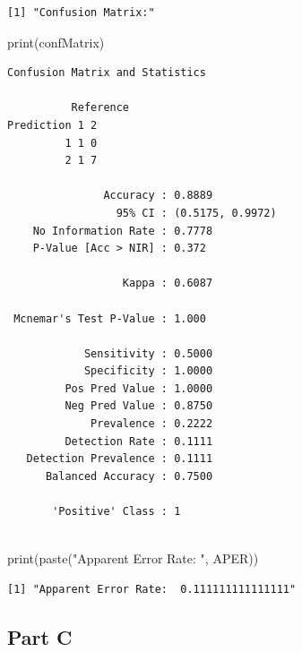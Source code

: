 \documentclass[
  letterpaper,
  DIV=11,
  numbers=noendperiod]{scrartcl}
\newenvironment{Shaded}{}{}
\newcommand{\FunctionTok}[1]{\textcolor[rgb]{0.41,0.62,0.42}{#1}}
\newcommand{\NormalTok}[1]{\textcolor[rgb]{0.24,0.22,0.21}{#1}}
\newcommand{\StringTok}[1]{\textcolor[rgb]{0.60,0.59,0.10}{#1}}
\begin{document}
\begin{verbatim}
[1] "Confusion Matrix:"
\end{verbatim}

\begin{Shaded}
\begin{Highlighting}[]
\FunctionTok{print}\NormalTok{(confMatrix)}
\end{Highlighting}
\end{Shaded}

\begin{verbatim}
Confusion Matrix and Statistics

          Reference
Prediction 1 2
         1 1 0
         2 1 7
                                          
               Accuracy : 0.8889          
                 95% CI : (0.5175, 0.9972)
    No Information Rate : 0.7778          
    P-Value [Acc > NIR] : 0.372           
                                          
                  Kappa : 0.6087          
                                          
 Mcnemar's Test P-Value : 1.000           
                                          
            Sensitivity : 0.5000          
            Specificity : 1.0000          
         Pos Pred Value : 1.0000          
         Neg Pred Value : 0.8750          
             Prevalence : 0.2222          
         Detection Rate : 0.1111          
   Detection Prevalence : 0.1111          
      Balanced Accuracy : 0.7500          
                                          
       'Positive' Class : 1               
                                          
\end{verbatim}

\begin{Shaded}
\begin{Highlighting}[]
\FunctionTok{print}\NormalTok{(}\FunctionTok{paste}\NormalTok{(}\StringTok{"Apparent Error Rate: "}\NormalTok{, APER))}
\end{Highlighting}
\end{Shaded}

\begin{verbatim}
[1] "Apparent Error Rate:  0.111111111111111"
\end{verbatim}

\newpage{}

\hypertarget{part-c-1}{%
\subsection{Part C}\label{part-c-1}}
\end{document}
